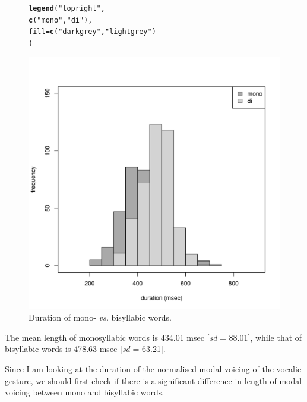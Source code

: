 \documentclass[a4paper,11pt]{article}\usepackage[]{graphicx}\usepackage[]{color}
\makeatletter
\def\maxwidth{ %
  \ifdim\Gin@nat@width>\linewidth
    \linewidth
  \else
    \Gin@nat@width
  \fi
}
\newcommand{\hlstr}[1]{\textcolor[rgb]{0.192,0.494,0.8}{#1}}%
\newcommand{\hlstd}[1]{\textcolor[rgb]{0.345,0.345,0.345}{#1}}%
\newcommand{\hlkwc}[1]{\textcolor[rgb]{0.333,0.667,0.333}{#1}}%
\newcommand{\hlkwd}[1]{\textcolor[rgb]{0.737,0.353,0.396}{\textbf{#1}}}%
\newenvironment{kframe}{%
 \def\at@end@of@kframe{}%
 \ifinner\ifhmode%
  \def\at@end@of@kframe{\end{minipage}}%
  \begin{minipage}{\columnwidth}%
 \fi\fi%
 \def\FrameCommand##1{\hskip\@totalleftmargin \hskip-\fboxsep
 \colorbox{shadecolor}{##1}\hskip-\fboxsep
     \hskip-\linewidth \hskip-\@totalleftmargin \hskip\columnwidth}%
 \MakeFramed {\advance\hsize-\width
   \@totalleftmargin\z@ \linewidth\hsize
   \@setminipage}}%
 {\par\unskip\endMakeFramed%
 \at@end@of@kframe}
\newenvironment{knitrout}{}{} %
\makeatother
\begin{document}
\begin{figure}
\begin{knitrout}
\begin{kframe}
\begin{alltt}
\hlkwd{legend}\hlstd{(}\hlstr{"topright"}\hlstd{,}
       \hlkwd{c}\hlstd{(}\hlstr{"mono"}\hlstd{,} \hlstr{"di"}\hlstd{),}
       \hlkwc{fill} \hlstd{=} \hlkwd{c}\hlstd{(}\hlstr{"darkgrey"}\hlstd{,}\hlstr{"lightgrey"}\hlstd{)}
       \hlstd{)}
\end{alltt}
\end{kframe}
\includegraphics[width=\maxwidth]{img/word-duration-1} 

\end{knitrout}
\caption{Duration of mono- \textit{vs.} bisyllabic words.}
\end{figure}

The mean length of monosyllabic words is 434.01 msec [\textit{sd} = 88.01], while that of bisyllabic words is 478.63 msec [\textit{sd} = 63.21].

Since I am looking at the duration of the normalised modal voicing of the vocalic gesture, we should first check if there is a significant difference in length of modal voicing between mono and bisyllabic words.
\end{document}
